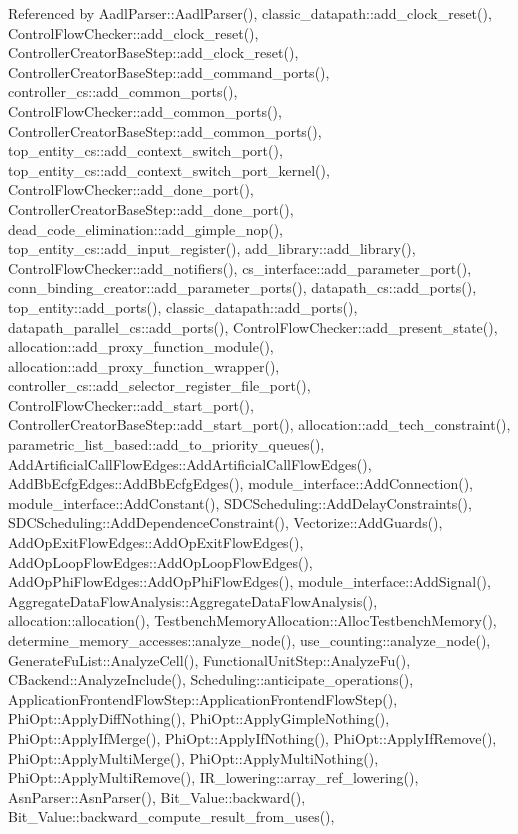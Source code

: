 Referenced by Aadl\+Parser\+::\+Aadl\+Parser(), classic\+\_\+datapath\+::add\+\_\+clock\+\_\+reset(), Control\+Flow\+Checker\+::add\+\_\+clock\+\_\+reset(), Controller\+Creator\+Base\+Step\+::add\+\_\+clock\+\_\+reset(), Controller\+Creator\+Base\+Step\+::add\+\_\+command\+\_\+ports(), controller\+\_\+cs\+::add\+\_\+common\+\_\+ports(), Control\+Flow\+Checker\+::add\+\_\+common\+\_\+ports(), Controller\+Creator\+Base\+Step\+::add\+\_\+common\+\_\+ports(), top\+\_\+entity\+\_\+cs\+::add\+\_\+context\+\_\+switch\+\_\+port(), top\+\_\+entity\+\_\+cs\+::add\+\_\+context\+\_\+switch\+\_\+port\+\_\+kernel(), Control\+Flow\+Checker\+::add\+\_\+done\+\_\+port(), Controller\+Creator\+Base\+Step\+::add\+\_\+done\+\_\+port(), dead\+\_\+code\+\_\+elimination\+::add\+\_\+gimple\+\_\+nop(), top\+\_\+entity\+\_\+cs\+::add\+\_\+input\+\_\+register(), add\+\_\+library\+::add\+\_\+library(), Control\+Flow\+Checker\+::add\+\_\+notifiers(), cs\+\_\+interface\+::add\+\_\+parameter\+\_\+port(), conn\+\_\+binding\+\_\+creator\+::add\+\_\+parameter\+\_\+ports(), datapath\+\_\+cs\+::add\+\_\+ports(), top\+\_\+entity\+::add\+\_\+ports(), classic\+\_\+datapath\+::add\+\_\+ports(), datapath\+\_\+parallel\+\_\+cs\+::add\+\_\+ports(), Control\+Flow\+Checker\+::add\+\_\+present\+\_\+state(), allocation\+::add\+\_\+proxy\+\_\+function\+\_\+module(), allocation\+::add\+\_\+proxy\+\_\+function\+\_\+wrapper(), controller\+\_\+cs\+::add\+\_\+selector\+\_\+register\+\_\+file\+\_\+port(), Control\+Flow\+Checker\+::add\+\_\+start\+\_\+port(), Controller\+Creator\+Base\+Step\+::add\+\_\+start\+\_\+port(), allocation\+::add\+\_\+tech\+\_\+constraint(), parametric\+\_\+list\+\_\+based\+::add\+\_\+to\+\_\+priority\+\_\+queues(), Add\+Artificial\+Call\+Flow\+Edges\+::\+Add\+Artificial\+Call\+Flow\+Edges(), Add\+Bb\+Ecfg\+Edges\+::\+Add\+Bb\+Ecfg\+Edges(), module\+\_\+interface\+::\+Add\+Connection(), module\+\_\+interface\+::\+Add\+Constant(), S\+D\+C\+Scheduling\+::\+Add\+Delay\+Constraints(), S\+D\+C\+Scheduling\+::\+Add\+Dependence\+Constraint(), Vectorize\+::\+Add\+Guards(), Add\+Op\+Exit\+Flow\+Edges\+::\+Add\+Op\+Exit\+Flow\+Edges(), Add\+Op\+Loop\+Flow\+Edges\+::\+Add\+Op\+Loop\+Flow\+Edges(), Add\+Op\+Phi\+Flow\+Edges\+::\+Add\+Op\+Phi\+Flow\+Edges(), module\+\_\+interface\+::\+Add\+Signal(), Aggregate\+Data\+Flow\+Analysis\+::\+Aggregate\+Data\+Flow\+Analysis(), allocation\+::allocation(), Testbench\+Memory\+Allocation\+::\+Alloc\+Testbench\+Memory(), determine\+\_\+memory\+\_\+accesses\+::analyze\+\_\+node(), use\+\_\+counting\+::analyze\+\_\+node(), Generate\+Fu\+List\+::\+Analyze\+Cell(), Functional\+Unit\+Step\+::\+Analyze\+Fu(), C\+Backend\+::\+Analyze\+Include(), Scheduling\+::anticipate\+\_\+operations(), Application\+Frontend\+Flow\+Step\+::\+Application\+Frontend\+Flow\+Step(), Phi\+Opt\+::\+Apply\+Diff\+Nothing(), Phi\+Opt\+::\+Apply\+Gimple\+Nothing(), Phi\+Opt\+::\+Apply\+If\+Merge(), Phi\+Opt\+::\+Apply\+If\+Nothing(), Phi\+Opt\+::\+Apply\+If\+Remove(), Phi\+Opt\+::\+Apply\+Multi\+Merge(), Phi\+Opt\+::\+Apply\+Multi\+Nothing(), Phi\+Opt\+::\+Apply\+Multi\+Remove(), I\+R\+\_\+lowering\+::array\+\_\+ref\+\_\+lowering(), Asn\+Parser\+::\+Asn\+Parser(), Bit\+\_\+\+Value\+::backward(), Bit\+\_\+\+Value\+::backward\+\_\+compute\+\_\+result\+\_\+from\+\_\+uses(), 